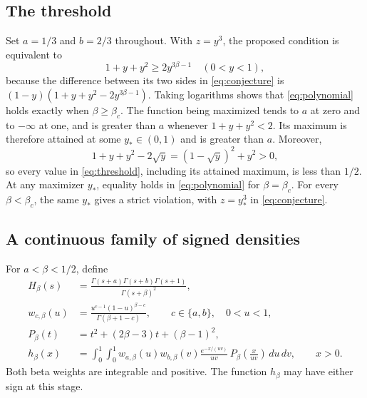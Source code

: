 \documentclass[11pt]{article}
\begin{document}
\subsection*{The threshold}
Set $a=1/3$ and $b=2/3$ throughout. With $z=y^3$, the proposed condition is
equivalent to
\begin{equation}\label{eq:polynomial}
 1+y+y^2\geq2y^{3\beta-1}\quad(0<y<1),
\end{equation}
because the difference between its two sides in \eqref{eq:conjecture}
is $(1-y)(1+y+y^2-2y^{3\beta-1})$.
Taking logarithms shows that \eqref{eq:polynomial} holds exactly when
$\beta\geq\beta_c$.
The function being maximized tends to $a$ at zero and to $-\infty$ at one,
and is greater than $a$ whenever $1+y+y^2<2$. Its maximum is therefore
attained at some $y_*\in(0,1)$ and is greater than $a$.
Moreover,
\[
 1+y+y^2-2\sqrt y=(1-\sqrt y)^2+y^2>0,
\]
so every value in \eqref{eq:threshold}, including its attained maximum,
is less than $1/2$.
At any maximizer $y_*$, equality holds in \eqref{eq:polynomial} for
$\beta=\beta_c$. For every $\beta<\beta_c$, the same $y_*$ gives a strict
violation, with $z=y_*^3$ in \eqref{eq:conjecture}.

\subsection*{A continuous family of signed densities}
For $a<\beta<1/2$, define
\begin{align}
 H_\beta(s)&=\frac{\Gamma(s+a)\Gamma(s+b)\Gamma(s+1)}
                       {\Gamma(s+\beta)^2},\label{eq:mellin}\\
 w_{c,\beta}(u)&=\frac{u^{c-1}(1-u)^{\beta-c}}
                         {\Gamma(\beta+1-c)},
 \qquad c\in\{a,b\},\quad 0<u<1,\label{eq:weights}\\
 P_\beta(t)&=t^2+(2\beta-3)t+(\beta-1)^2,\label{eq:quadratic}\\
 h_\beta(x)&=\int_0^1\int_0^1
 w_{a,\beta}(u)w_{b,\beta}(v)
 \frac{e^{-x/(uv)}}{uv}\,P_\beta\!\left(\frac{x}{uv}\right)\,du\,dv,
 \qquad x>0.\label{eq:density}
\end{align}
Both beta weights are integrable and positive. The function $h_\beta$
may have either sign at this stage.
\end{document}
